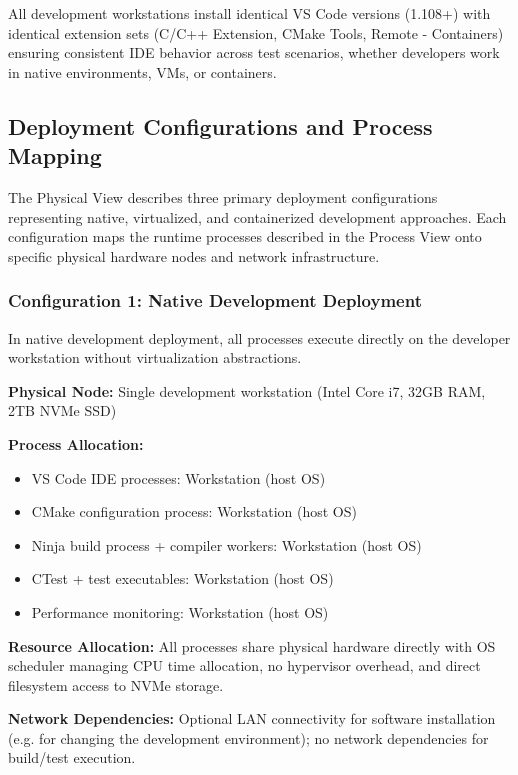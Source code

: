 All development workstations install identical VS Code versions (1.108+) with identical extension sets (C/C++ Extension, CMake Tools, Remote - Containers) ensuring consistent IDE behavior across test scenarios, whether developers work in native environments, VMs, or containers.

\subsection{Deployment Configurations and Process Mapping}

The Physical View describes three primary deployment configurations representing native, virtualized, and containerized development approaches.
Each configuration maps the runtime processes described in the Process View onto specific physical hardware nodes and network infrastructure.

\subsubsection{Configuration 1: Native Development Deployment}

In native development deployment, all processes execute directly on the developer workstation without virtualization abstractions.

\textbf{Physical Node:} Single development workstation (Intel Core i7, 32GB RAM, 2TB NVMe SSD)

\textbf{Process Allocation:}
\begin{itemize}
\item VS Code IDE processes: Workstation (host OS)
\item CMake configuration process: Workstation (host OS)
\item Ninja build process + compiler workers: Workstation (host OS)
\item CTest + test executables: Workstation (host OS)
\item Performance monitoring: Workstation (host OS)
\end{itemize}

\textbf{Resource Allocation:} All processes share physical hardware directly with OS scheduler managing CPU time allocation, no hypervisor overhead, and direct filesystem access to NVMe storage.

\textbf{Network Dependencies:} Optional LAN connectivity for software installation (e.g. for changing the development environment); no network dependencies for build/test execution.

